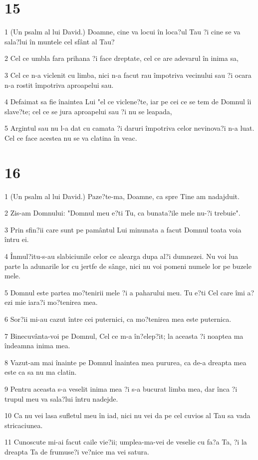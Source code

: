 \chapter{15}

\par 1 (Un psalm al lui David.) Doamne, cine va locui în loca?ul Tau ?i cine se va sala?lui în muntele cel sfânt al Tau?
\par 2 Cel ce umbla fara prihana ?i face dreptate, cel ce are adevarul în inima sa,
\par 3 Cel ce n-a viclenit cu limba, nici n-a facut rau împotriva vecinului sau ?i ocara n-a rostit împotriva aproapelui sau.
\par 4 Defaimat sa fie înaintea Lui "el ce viclene?te, iar pe cei ce se tem de Domnul îi slave?te; cel ce se jura aproapelui sau ?i nu se leapada,
\par 5 Argintul sau nu l-a dat cu camata ?i daruri împotriva celor nevinova?i n-a luat. Cel ce face acestea nu se va clatina în veac.

\chapter{16}

\par 1 (Un psalm al lui David.) Paze?te-ma, Doamne, ca spre Tine am nadajduit.
\par 2 Zis-am Domnului: "Domnul meu e?ti Tu, ca bunata?ile mele nu-?i trebuie".
\par 3 Prin sfin?ii care sunt pe pamântul Lui minunata a facut Domnul toata voia întru ei.
\par 4 Înmul?itu-s-au slabiciunile celor ce alearga dupa al?i dumnezei. Nu voi lua parte la adunarile lor cu jertfe de sânge, nici nu voi pomeni numele lor pe buzele mele.
\par 5 Domnul este partea mo?tenirii mele ?i a paharului meu. Tu e?ti Cel care îmi a?ezi mie iara?i mo?tenirea mea.
\par 6 Sor?ii mi-au cazut între cei puternici, ca mo?tenirea mea este puternica.
\par 7 Binecuvânta-voi pe Domnul, Cel ce m-a în?elep?it; la aceasta ?i noaptea ma îndeamna inima mea.
\par 8 Vazut-am mai înainte pe Domnul înaintea mea pururea, ca de-a dreapta mea este ca sa nu ma clatin.
\par 9 Pentru aceasta s-a veselit inima mea ?i s-a bucurat limba mea, dar înca ?i trupul meu va sala?lui întru nadejde.
\par 10 Ca nu vei lasa sufletul meu în iad, nici nu vei da pe cel cuvios al Tau sa vada stricaciunea.
\par 11 Cunoscute mi-ai facut caile vie?ii; umplea-ma-vei de veselie cu fa?a Ta, ?i la dreapta Ta de frumuse?i ve?nice ma vei satura.

